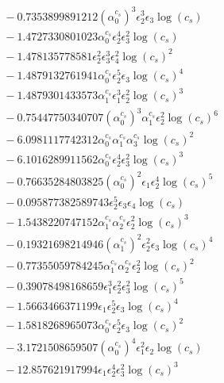 \documentclass[10pt]{article}
\begin{document}
\begin{align*}
&{}  - 0.7353899891212 \left(\alpha_{0}^{c_s}\right)^{3} \epsilon_{2}^{3} \epsilon_{3} \log{\left(c_{s} \right)} \\
&{}  - 1.4727330801023 \alpha_{0}^{c_s} \epsilon_{2}^{4} \epsilon_{3}^{2} \log{\left(c_{s} \right)} \\
&{}  - 1.478135778581 \epsilon_{2}^{2} \epsilon_{3}^{3} \epsilon_{4}^{2} \log{\left(c_{s} \right)}^{2} \\
&{}  - 1.4879132761941 \alpha_{0}^{c_s} \epsilon_{2}^{5} \epsilon_{3} \log{\left(c_{s} \right)}^{4} \\
&{}  - 1.4879301433573 \alpha_{1}^{c_s} \epsilon_{1}^{3} \epsilon_{2}^{2} \log{\left(c_{s} \right)}^{3} \\
&{}  - 0.75447750340707 \left(\alpha_{0}^{c_s}\right)^{3} \alpha_{1}^{c_s} \epsilon_{2}^{2} \log{\left(c_{s} \right)}^{6} \\
&{}  - 6.0981117742312 \alpha_{0}^{c_s} \alpha_{1}^{c_s} \alpha_{3}^{c_s} \log{\left(c_{s} \right)}^{2} \\
&{}  - 6.1016289911562 \alpha_{0}^{c_s} \epsilon_{2}^{4} \epsilon_{3}^{2} \log{\left(c_{s} \right)}^{3} \\
&{}  - 0.76635284803825 \left(\alpha_{0}^{c_s}\right)^{2} \epsilon_{1} \epsilon_{2}^{4} \log{\left(c_{s} \right)}^{5} \\
&{}  - 0.095877382589743 \epsilon_{2}^{5} \epsilon_{3} \epsilon_{4} \log{\left(c_{s} \right)} \\
&{}  - 1.5438220747152 \alpha_{1}^{c_s} \alpha_{2}^{c_s} \epsilon_{2}^{2} \log{\left(c_{s} \right)}^{3} \\
&{}  - 0.19321698214946 \left(\alpha_{1}^{c_s}\right)^{2} \epsilon_{2}^{2} \epsilon_{3} \log{\left(c_{s} \right)}^{4} \\
&{}  - 0.77355059784245 \alpha_{1}^{c_s} \alpha_{2}^{c_s} \epsilon_{2}^{2} \log{\left(c_{s} \right)}^{2} \\
&{}  - 0.39078498168659 \epsilon_{1}^{3} \epsilon_{2}^{2} \epsilon_{3}^{2} \log{\left(c_{s} \right)}^{5} \\
&{}  - 1.5663466371199 \epsilon_{1} \epsilon_{2}^{5} \epsilon_{3} \log{\left(c_{s} \right)}^{4} \\
&{}  - 1.5818268965073 \alpha_{0}^{c_s} \epsilon_{2}^{5} \epsilon_{3} \log{\left(c_{s} \right)}^{2} \\
&{}  - 3.1721508659507 \left(\alpha_{0}^{c_s}\right)^{4} \epsilon_{1}^{2} \epsilon_{2} \log{\left(c_{s} \right)} \\
&{}  - 12.857621917994 \epsilon_{1} \epsilon_{2}^{4} \epsilon_{3}^{2} \log{\left(c_{s} \right)}^{3} \\

\end{align*}
\end{document}
